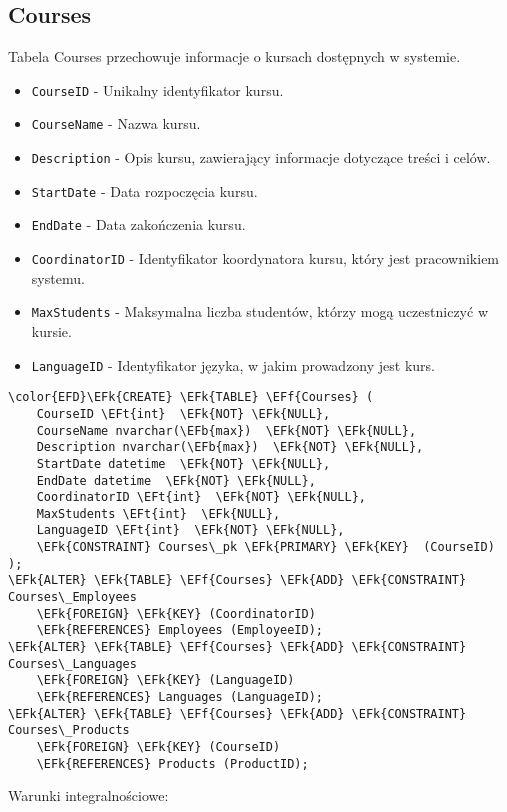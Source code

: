 \documentclass[11pt]{article}
\newcommand{\EFk}[1]{\textcolor{EFk}{\textbf{#1}}} %
\newcommand{\EFb}[1]{\textcolor{EFb}{\textbf{#1}}} %
\newcommand{\EFf}[1]{\textcolor{EFf}{#1}} %
\newcommand{\EFt}[1]{\textcolor{EFt}{\textbf{#1}}} %
\begin{document}
\subsection{Courses}
\label{sec:orgcc578c2}
Tabela Courses przechowuje informacje o kursach dostępnych w systemie.
\begin{itemize}
\item \texttt{CourseID} - Unikalny identyfikator kursu.
\item \texttt{CourseName} - Nazwa kursu.
\item \texttt{Description} - Opis kursu, zawierający informacje dotyczące treści i celów.
\item \texttt{StartDate} - Data rozpoczęcia kursu.
\item \texttt{EndDate} - Data zakończenia kursu.

\item \texttt{CoordinatorID} - Identyfikator koordynatora kursu, który jest pracownikiem systemu.
\item \texttt{MaxStudents} - Maksymalna liczba studentów, którzy mogą uczestniczyć w kursie.
\item \texttt{LanguageID} - Identyfikator języka, w jakim prowadzony jest kurs.
\end{itemize}
\begin{Code}
\begin{Verbatim}
\color{EFD}\EFk{CREATE} \EFk{TABLE} \EFf{Courses} (
    CourseID \EFt{int}  \EFk{NOT} \EFk{NULL},
    CourseName nvarchar(\EFb{max})  \EFk{NOT} \EFk{NULL},
    Description nvarchar(\EFb{max})  \EFk{NOT} \EFk{NULL},
    StartDate datetime  \EFk{NOT} \EFk{NULL},
    EndDate datetime  \EFk{NOT} \EFk{NULL},
    CoordinatorID \EFt{int}  \EFk{NOT} \EFk{NULL},
    MaxStudents \EFt{int}  \EFk{NULL},
    LanguageID \EFt{int}  \EFk{NOT} \EFk{NULL},
    \EFk{CONSTRAINT} Courses\_pk \EFk{PRIMARY} \EFk{KEY}  (CourseID)
);
\EFk{ALTER} \EFk{TABLE} \EFf{Courses} \EFk{ADD} \EFk{CONSTRAINT} Courses\_Employees
    \EFk{FOREIGN} \EFk{KEY} (CoordinatorID)
    \EFk{REFERENCES} Employees (EmployeeID);
\EFk{ALTER} \EFk{TABLE} \EFf{Courses} \EFk{ADD} \EFk{CONSTRAINT} Courses\_Languages
    \EFk{FOREIGN} \EFk{KEY} (LanguageID)
    \EFk{REFERENCES} Languages (LanguageID);
\EFk{ALTER} \EFk{TABLE} \EFf{Courses} \EFk{ADD} \EFk{CONSTRAINT} Courses\_Products
    \EFk{FOREIGN} \EFk{KEY} (CourseID)
    \EFk{REFERENCES} Products (ProductID);
\end{Verbatim}
\end{Code}
Warunki integralnościowe:
\end{document}
